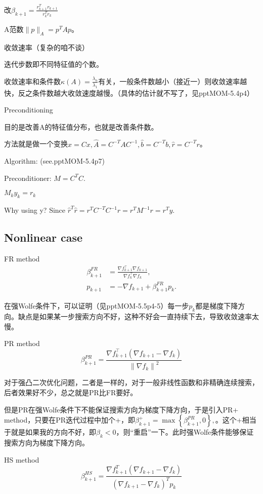 改$\beta_{k+1}=\frac{r_{k+1}^{T} r_{k+1}}{r_{k}^{T} r_{k}}$

A范数$\|p\|_A = p^TAp$。

收敛速率（复杂的咱不谈）

迭代步数即不同特征值的个数。

收敛速率和条件数$\kappa(A) = \frac{\lambda_n}{\lambda_1}$有关，一般条件数越小（接近一）则收敛速率越快，反之条件数越大收敛速度越慢。（具体的估计就不写了，见pptMOM-5.4p4）

Preconditioning

目的是改善A的特征值分布，也就是改善条件数。

方法就是做一个变换$\hat{x} = Cx, \hat{A} = C^{-T}AC^{-1}, \hat{b} = C^{-T}b, \hat{r} = C^{-T}r$。

Algorithm: (see.pptMOM-5.4p7)

Preconditioner: $M = C^T C$.

$M_k y_k = r_k$

Why using y? Since $\hat{r}^T\hat{r} = r^T C^{-T} C^{-1} r = r^T M^{-1} r = r^T y$.

\subsection{Nonlinear case}

FR method
\[
  \begin{aligned}
    \beta_{k+1}^{F R}&=\frac{\nabla f_{k+1}^{\top} \nabla f_{k+1}}{\nabla f_{k}^{\top} \nabla f_{k}}, \\
    p_{k+1}&=-\nabla f_{k+1}+\beta_{k+1}^{F R} p_{k}.
  \end{aligned}
\]

在强Wolfe条件下，可以证明（见pptMOM-5.5p4-5）每一步$p_k$都是梯度下降方向。缺点是如果某一步搜索方向不好，这种不好会一直持续下去，导致收敛速率太慢。

PR method
\[
  \beta_{k+1}^{P R}=\frac{\nabla f_{k+1}^{\top}\left(\nabla f_{k+1}-\nabla f_{k}\right)}{\left\|\nabla f_{k}\right\|^{2}}
\]

对于强凸二次优化问题，二者是一样的，对于一般非线性函数和非精确连续搜索，后者效果好不少，总之就是PR比FR要好。

但是PR在强Wolfe条件下不能保证搜索方向为梯度下降方向，于是引入PR+ method，只要在PR迭代过程中加个+，即$\beta_{k+1}^{+}=\max \left\{\beta_{k+1}^{P R}, 0\right\},$。这个+相当于就是如果我的方向不好，即$\beta_k < 0$，则“重启”一下。此时强Wolfe条件能够保证搜索方向为梯度下降方向。

HS method
\[
  \beta_{k+1}^{H S}=\frac{\nabla f_{k+1}^{T}\left(\nabla f_{k+1}-\nabla f_{k}\right)}{\left(\nabla f_{k+1}-\nabla f_{k}\right)^{T} p_{k}} 
\]

